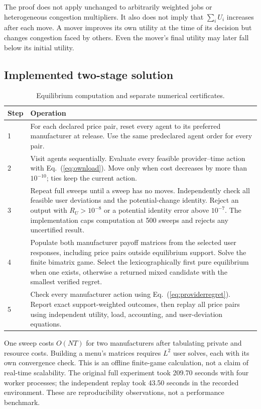 \documentclass[11pt,a4paper]{article}
\begin{document}
The proof does not apply unchanged to arbitrarily weighted jobs or heterogeneous congestion multipliers. It also does not imply that $\sum_i U_i$ increases after each move. A mover improves its own utility at the time of its decision but changes congestion faced by others. Even the mover's final utility may later fall below its initial utility.

\subsection{Implemented two-stage solution}
\begin{table}[htbp]
\centering
\caption{Equilibrium computation and separate numerical certificates.}
\label{tab:algorithm}
\begin{tabular}{@{}p{}p{}@{}}
\toprule
Step & Operation \\
\midrule
1 & For each declared price pair, reset every agent to its preferred manufacturer at release. Use the same predeclared agent order for every pair. \\
2 & Visit agents sequentially. Evaluate every feasible provider--time action with Eq.~(\ref{eq:ownload}). Move only when cost decreases by more than $10^{-10}$; ties keep the current action. \\
3 & Repeat full sweeps until a sweep has no moves. Independently check all feasible user deviations and the potential-change identity. Reject an output with $R_U>10^{-8}$ or a potential identity error above $10^{-7}$. The implementation caps computation at 500 sweeps and rejects any uncertified result. \\
4 & Populate both manufacturer payoff matrices from the selected user responses, including price pairs outside equilibrium support. Solve the finite bimatrix game. Select the lexicographically first pure equilibrium when one exists, otherwise a returned mixed candidate with the smallest verified regret. \\
5 & Check every manufacturer action using Eq.~(\ref{eq:providerregret}). Report exact support-weighted outcomes, then replay all price pairs using independent utility, load, accounting, and user-deviation equations. \\
\bottomrule
\end{tabular}
\end{table}

One sweep costs $O(NT)$ for two manufacturers after tabulating private and resource costs. Building a menu's matrices requires $L^2$ user solves, each with its own convergence check. This is an offline finite-game calculation, not a claim of real-time scalability. The original full experiment took 209.70 seconds with four worker processes; the independent replay took 43.50 seconds in the recorded environment. These are reproducibility observations, not a performance benchmark.
\end{document}
